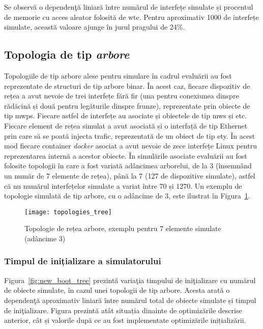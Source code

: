 Se observă o dependenţă liniară între numărul de interfețe simulate și procentul de memorie cu acces aleator folosită de \gls{wte}. Pentru aproximativ 1000 de interfețe simulate, această valoare ajunge în jurul pragului de 24\%.

\subsection{Topologia de tip \textit{arbore}}

Topologiile de tip arbore alese pentru simulare în cadrul evaluării au fost reprezentate de structuri de tip arbore binar. În acest caz, fiecare dispozitiv de rețea a avut nevoie de trei interfețe fără fir (una pentru conexiunea dinspre rădăcină și două pentru legăturile dinspre frunze), reprezentate prin obiecte de tip \gls{mwps}. Fiecare astfel de interfețe au asociate și obiectele de tip \gls{mws} și \gls{etc}. Fiecare element de rețea simulat a avut asociată și o interfață de tip Ethernet prin care să se poată injecta trafic, reprezentată de un obiect de tip \gls{ety}. În acest mod fiecare container \textit{docker} asociat a avut nevoie de zece interfețe Linux pentru reprezentarea internă a acestor obiecte. În simulările asociate evaluării au fost folosite topologii în care a fost variată adâncimea arborelui, de la 3 (însemnând un număr de 7 elemente de rețea), până la 7 (127 de dispozitive simulate), astfel că nu numărul interfețelor simulate a variat între 70 și 1270. Un exemplu de topologie simulată de tip arbore, cu o adâncime de 3, este ilustrat în Figura~\ref{fig:topologies_tree}.

\begin{figure}[h]
	\centering
	\texttt{[image: topologies\_tree]}
	\caption{Topologie de rețea arbore, exemplu pentru 7 elemente simulate (adâncime 3)}
	\label{fig:topologies_tree}
\end{figure}

\subsubsection{Timpul de inițializare a simulatorului}

Figura~\ref{fig:new_boot_tree} prezintă variaţia timpului de iniţializare cu numărul de obiecte simulate, în cazul unei topologii de tip arbore. Acesta arată o dependenţă aproximativ liniară între numărul total de obiecte simulate și timpul de iniţializare. Figura prezintă atât situația dinainte de optimizările descrise anterior, cât și valorile după ce au fost implementate optimizările inițializării.

